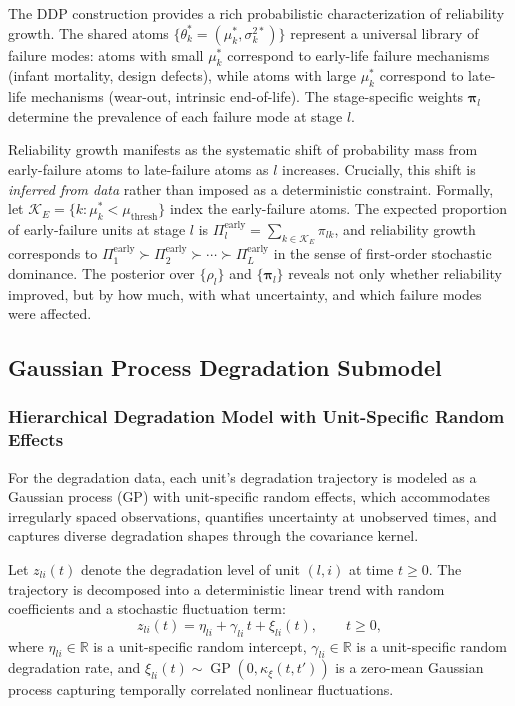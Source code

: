 \documentclass[a4paper,fleqn,longmktitle]{cas-sc}
\DeclareMathOperator{\GP}{GP}
\newcommand{\R}{\mathbb{R}}
\begin{document}
The DDP construction provides a rich probabilistic characterization of reliability growth. The shared atoms $\{\theta_k^* = (\mu_k^*, \sigma_k^{2*})\}$ represent a universal library of failure modes: atoms with small $\mu_k^*$ correspond to early-life failure mechanisms (infant mortality, design defects), while atoms with large $\mu_k^*$ correspond to late-life mechanisms (wear-out, intrinsic end-of-life). The stage-specific weights $\bm{\pi}_l$ determine the prevalence of each failure mode at stage $l$.

Reliability growth manifests as the systematic shift of probability mass from early-failure atoms to late-failure atoms as $l$ increases. Crucially, this shift is \emph{inferred from data} rather than imposed as a deterministic constraint. Formally, let $\mathcal{K}_E = \{k : \mu_k^* < \mu_{\text{thresh}}\}$ index the early-failure atoms. The expected proportion of early-failure units at stage $l$ is $\Pi_{l}^{\text{early}} = \sum_{k \in \mathcal{K}_E} \pi_{lk}$, and reliability growth corresponds to $\Pi_{1}^{\text{early}} \succ \Pi_{2}^{\text{early}} \succ \cdots \succ \Pi_{L}^{\text{early}}$ in the sense of first-order stochastic dominance. The posterior over $\{\rho_l\}$ and $\{\bm{\pi}_l\}$ reveals not only whether reliability improved, but by how much, with what uncertainty, and which failure modes were affected.

\subsection{Gaussian Process Degradation Submodel}
\label{sec:degradation}

\subsubsection{Hierarchical Degradation Model with Unit-Specific Random Effects}

For the degradation data, each unit's degradation trajectory is modeled as a Gaussian process (GP) with unit-specific random effects, which accommodates irregularly spaced observations, quantifies uncertainty at unobserved times, and captures diverse degradation shapes through the covariance kernel.

Let $z_{li}(t)$ denote the degradation level of unit $(l,i)$ at time $t \geq 0$. The trajectory is decomposed into a deterministic linear trend with random coefficients and a stochastic fluctuation term:
\begin{equation}\label{eq:gp_degrad}
    z_{li}(t) = \eta_{li} + \gamma_{li}\, t + \xi_{li}(t), \qquad t \geq 0,
\end{equation}
where $\eta_{li} \in \R$ is a unit-specific random intercept, $\gamma_{li} \in \R$ is a unit-specific random degradation rate, and $\xi_{li}(t) \sim \GP(0, \kappa_\xi(t, t'))$ is a zero-mean Gaussian process capturing temporally correlated nonlinear fluctuations.
\end{document}
